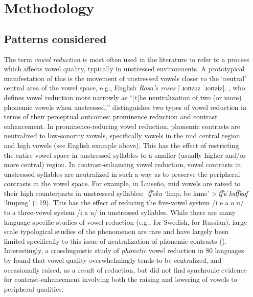 \section{ Methodology}\label{sec:6.2}
\subsection{ Patterns considered}\label{sec:6.2.1}

  The term \textit{vowel reduction} is most often used in the literature to refer to a process which affects vowel quality, typically in unstressed environments. A prototypical manifestation of this is the movement of unstressed vowels closer to the ‘neutral’ central area of the vowel space, e.g., English \textit{Rosa’s roses} [\textit{ˈ}ɹoʊzəz \textit{ˈ}ɹoʊzɨz]. \citet[1]{Crosswhite2000}, who defines vowel reduction more narrowly as “[t]he neutralization of two (or more) phonemic vowels when unstressed,” distinguishes two types of vowel reduction in terms of their perceptual outcomes: prominence reduction and contrast enhancement. In prominence-reducing vowel reduction, phonemic contrasts are neutralized to low-sonority vowels, specifically vowels in the mid central region and high vowels (see English example above). This has the effect of restricting the entire vowel space in unstressed syllables to a smaller (usually higher and/or more central) region. In contrast-enhancing vowel reduction, vowel contrasts in unstressed syllables are neutralized in such a way as to preserve the peripheral contrasts in the vowel space. For example, in Luiseño, mid vowels are raised to their high counterparts in unstressed syllables: \textit{ˈt͡ʃoka} ‘limp, be lame’ > \textit{t͡ʃuˈkat͡ʃkaʃ} ‘limping’ (\citealt{MunroBenson1973}: 19). This has the effect of reducing the five-vowel system /i e a o u/ to a three-vowel system /i a u/ in unstressed syllables. While there are many language-specific studies of vowel reduction (e.g., \citealt{Lindblom1963} for Swedish, \citealt{PadgettTabain2005} for Russian), large-scale typological studies of the phenomenon are rare and have largely been limited specifically to this issue of neutralization of phonemic contrasts (\citealt{Crosswhite2001,Crosswhite2004,Barnes2006}). Interestingly, a crosslinguistic study of \textit{phonetic} vowel reduction in 80 languages by \citet{KapatsinskiEtAl2019} found that vowel quality overwhelmingly tends to be centralized, and occasionally raised, as a result of reduction, but did not find synchronic evidence for contrast-enhancement involving both the raising and lowering of vowels to peripheral qualities.

